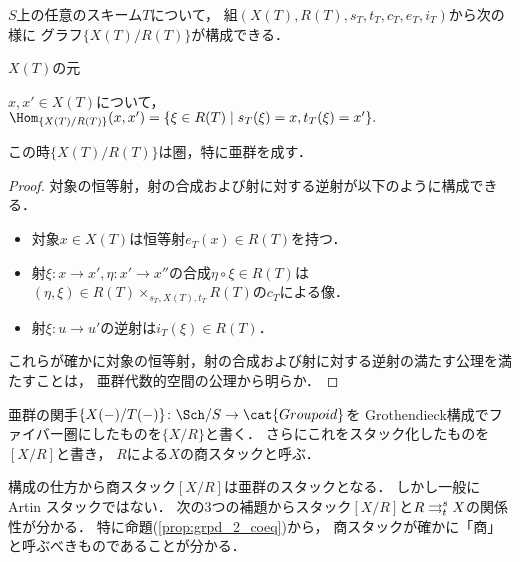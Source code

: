     \begin{Lemma}
        $S$上の任意のスキーム$T$について，
        組$(X(T), R(T), s_T, t_T, c_T, e_T, i_T)$から次の様に
        グラフ$\{X(T)/R(T)\}$が構成できる．
        \begin{description}[labelindent=0.5cm, leftmargin=1.5cm]
            \item[\underline{対象}]
                $X(T)$の元

            \item[\underline{射}]
                $x, x' \in X(T)$について，
                $\Hom_{\{X(T)/R(T)\}}(x, x')=\{\xi \in R(T) \mid s_T(\xi)=x, t_T(\xi)=x' \}.$
        \end{description}
        この時$\{X(T)/R(T)\}$は圏，特に亜群を成す．
    \end{Lemma}
    \begin{proof}
        対象の恒等射，射の合成および射に対する逆射が以下のように構成できる．
        \begin{itemize}
            \item 対象$x \in X(T)$は恒等射$e_T(x) \in R(T)$を持つ．
            
            \item
                射$\xi \colon x \to x', \eta \colon x' \to x''$の合成$\eta \circ \xi \in R(T)$は
                $(\eta, \xi) \in R(T) \times_{s_T, X(T), t_T} R(T)$の$c_T$による像．

            \item 射$\xi \colon u \to u'$の逆射は$i_T(\xi) \in R(T)$．
        \end{itemize}
        これらが確かに対象の恒等射，射の合成および射に対する逆射の満たす公理を満たすことは，
        亜群代数的空間の公理から明らか．
    \end{proof}

    \begin{Def}
        亜群の関手$\{X(-)/T(-)\} \colon \Sch/S \to \cat{Groupoid}$を
        Grothendieck構成でファイバー圏にしたものを$\{X/R\}$と書く．
        さらにこれをスタック化したものを$[X/R]$と書き，
        $R$による$X$の商スタックと呼ぶ．
    \end{Def}

    構成の仕方から商スタック$[X/R]$は亜群のスタックとなる．
    しかし一般に Artin スタックではない．
    次の$3$つの補題からスタック$[X/R]$と$R \mathrel{\mathop{\rightrightarrows}^{s}_{t}} X$の関係性が分かる．
    特に命題(\ref{prop:grpd_2_coeq})から，
    商スタックが確かに「商」と呼ぶべきものであることが分かる．

